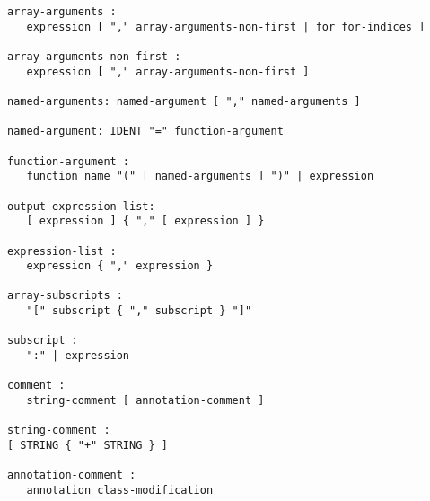 \begin{lstlisting}[language=grammar]
array-arguments :
   expression [ "," array-arguments-non-first | for for-indices ]

array-arguments-non-first :
   expression [ "," array-arguments-non-first ]

named-arguments: named-argument [ "," named-arguments ]

named-argument: IDENT "=" function-argument

function-argument :
   function name "(" [ named-arguments ] ")" | expression

output-expression-list:
   [ expression ] { "," [ expression ] }

expression-list :
   expression { "," expression }

array-subscripts :
   "[" subscript { "," subscript } "]"

subscript :
   ":" | expression

comment :
   string-comment [ annotation-comment ]

string-comment :
[ STRING { "+" STRING } ]

annotation-comment :
   annotation class-modification
\end{lstlisting}
